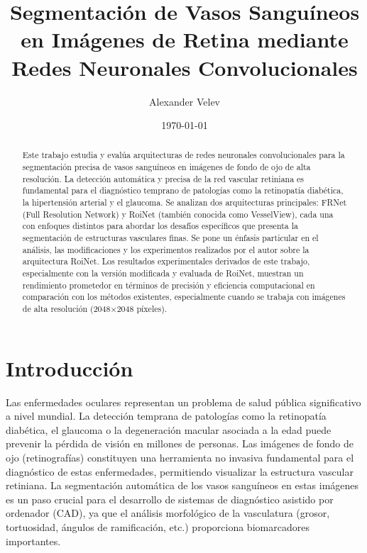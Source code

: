 \documentclass[11pt,a4paper]{report} %
\title{Segmentación de Vasos Sanguíneos en Imágenes de Retina mediante Redes Neuronales Convolucionales}
\author{Alexander Velev}
\date{\today}
\begin{document}
\maketitle

\begin{abstract}
Este trabajo estudia y evalúa arquitecturas de redes neuronales convolucionales para la segmentación precisa de vasos sanguíneos en imágenes de fondo de ojo de alta resolución. La detección automática y precisa de la red vascular retiniana es fundamental para el diagnóstico temprano de patologías como la retinopatía diabética, la hipertensión arterial y el glaucoma. Se analizan dos arquitecturas principales: FRNet (Full Resolution Network) y RoiNet (también conocida como VesselView), cada una con enfoques distintos para abordar los desafíos específicos que presenta la segmentación de estructuras vasculares finas. Se pone un énfasis particular en el análisis, las modificaciones y los experimentos realizados por el autor sobre la arquitectura RoiNet. Los resultados experimentales derivados de este trabajo, especialmente con la versión modificada y evaluada de RoiNet, muestran un rendimiento prometedor en términos de precisión y eficiencia computacional en comparación con los métodos existentes, especialmente cuando se trabaja con imágenes de alta resolución (2048×2048 píxeles).
\end{abstract}

\tableofcontents
\listoftables
\listoffigures

\chapter{Introducción}
Las enfermedades oculares representan un problema de salud pública significativo a nivel mundial. La detección temprana de patologías como la retinopatía diabética, el glaucoma o la degeneración macular asociada a la edad puede prevenir la pérdida de visión en millones de personas. Las imágenes de fondo de ojo (retinografías) constituyen una herramienta no invasiva fundamental para el diagnóstico de estas enfermedades, permitiendo visualizar la estructura vascular retiniana. La segmentación automática de los vasos sanguíneos en estas imágenes es un paso crucial para el desarrollo de sistemas de diagnóstico asistido por ordenador (CAD), ya que el análisis morfológico de la vasculatura (grosor, tortuosidad, ángulos de ramificación, etc.) proporciona biomarcadores importantes.
\end{document}

